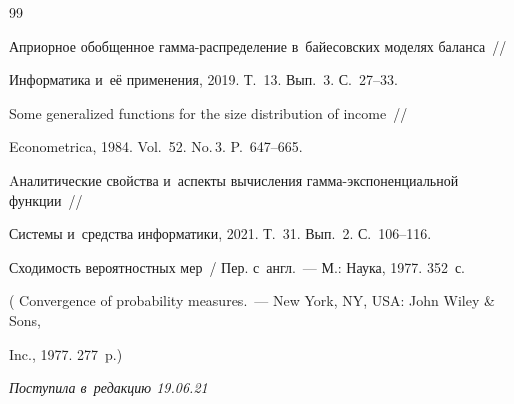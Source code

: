 {{\begin{thebibliography}{99}




Априорное обобщенное гам\-ма-рас\-пре\-де\-ле\-ние в~байесовских моделях баланса~/\!\!/ 


Информатика и~её применения, 2019. Т.~13. Вып.~3. С.~27--33.









Some generalized functions for the size distribution of income~/\!\!/ 


Econometrica, 1984. Vol.~52. No.\,3. P.~647--665.









Aналитические свойства и~аспекты вычисления гам\-ма-экс\-по\-нен\-ци\-аль\-ной функции~/\!\!/ 


Системы и~средства информатики, 2021. Т.~31. Вып.~2. С.~106--116.









Сходимость вероятностных мер~/ Пер. с~англ.~--- М.: Наука, 1977. 352~с.


( {Convergence of probability measures}.~--- New York, NY, USA: John Wiley \& Sons, 


Inc., 1977. 277~p.)





  \end{thebibliography}


} }











\vspace*{-7pt}





\hfill{\small\textit{Поступила в~редакцию 19.06.21}}





\vspace*{8pt}





